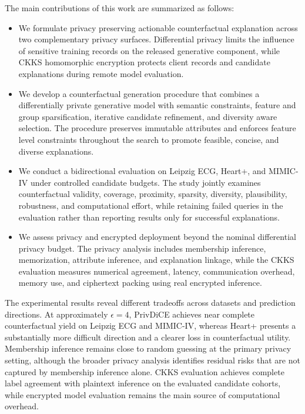 \documentclass[preprint,12pt]{elsarticle}
\begin{document}
The main contributions of this work are summarized as follows:
\begin{itemize}
    \item We formulate privacy preserving actionable counterfactual explanation
    across two complementary privacy surfaces. Differential privacy limits the influence of sensitive training records on the released generative
    component, while CKKS homomorphic encryption protects client records and
    candidate explanations during remote model evaluation.

    \item We develop a counterfactual generation procedure that combines a
    differentially private generative model with semantic constraints, feature and group sparsification, iterative candidate refinement, and diversity aware selection. The procedure preserves immutable attributes and enforces feature level constraints throughout the search to promote feasible, concise, and diverse explanations.

    \item We conduct a bidirectional evaluation on Leipzig ECG, Heart+, and
    MIMIC-IV under controlled candidate budgets. The study jointly examines
    counterfactual validity, coverage, proximity, sparsity, diversity,
    plausibility, robustness, and computational effort, while retaining failed queries in the evaluation rather than reporting results only for successful explanations.

    \item We assess privacy and encrypted deployment beyond the nominal  differential privacy budget. The privacy analysis includes membership
    inference, memorization, attribute inference, and explanation linkage,
    while the CKKS evaluation measures numerical agreement, latency,
    communication overhead, memory use, and ciphertext packing using real
    encrypted inference.
\end{itemize}

The experimental results reveal different tradeoffs across datasets and
prediction directions. At approximately $\epsilon=4$, PrivDiCE achieves near
complete counterfactual yield on Leipzig ECG and MIMIC-IV, whereas Heart+
presents a substantially more difficult direction and a clearer loss in counterfactual utility. Membership inference remains close to random guessing
at the primary privacy setting, although the broader privacy analysis identifies
residual risks that are not captured by membership inference alone. CKKS
evaluation achieves complete label agreement with plaintext inference on the
evaluated candidate cohorts, while encrypted model evaluation remains the main
source of computational overhead.
\end{document}
